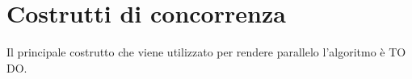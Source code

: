 % 
%
%

\section{Costrutti di concorrenza} %
\label{sec:costrutti_di_concorrenza}
Il principale costrutto che viene utilizzato per rendere parallelo l'algoritmo è TO DO.


